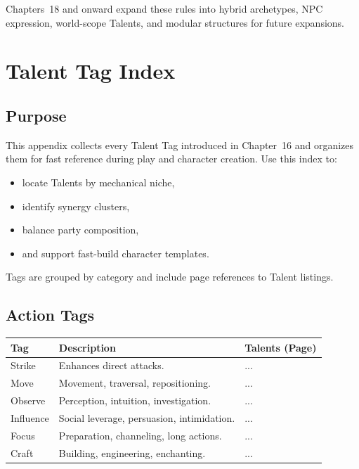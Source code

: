 \documentclass[11pt]{book}
\begin{document}
Chapters~18 and onward expand these rules into hybrid archetypes, NPC expression,
world-scope Talents, and modular structures for future expansions.


\appendix
\chapter{Talent Tag Index}

\section{Purpose}

This appendix collects every Talent Tag introduced in Chapter~16
and organizes them for fast reference during play and character creation.
Use this index to:
\begin{itemize}
    \item locate Talents by mechanical niche,
    \item identify synergy clusters,
    \item balance party composition,
    \item and support fast-build character templates.
\end{itemize}

Tags are grouped by category and include page references to Talent listings.

\section{Action Tags}

\begin{longtable}{|p{3cm}|p{6cm}|p{4cm}|}
\hline
\textbf{Tag} & \textbf{Description} & \textbf{Talents (Page)} \\ \hline
Strike & Enhances direct attacks. & ... \\ \hline
Move & Movement, traversal, repositioning. & ... \\ \hline
Observe & Perception, intuition, investigation. & ... \\ \hline
Influence & Social leverage, persuasion, intimidation. & ... \\ \hline
Focus & Preparation, channeling, long actions. & ... \\ \hline
Craft & Building, engineering, enchanting. & ... \\ \hline
\end{longtable}
\end{document}
